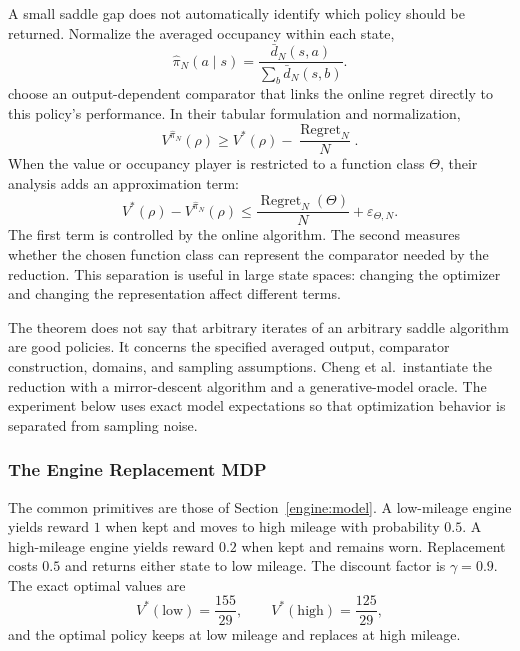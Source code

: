 A small saddle gap does not automatically identify which policy should be returned. Normalize the averaged occupancy within each state,
\begin{equation}
\widehat\pi_N(a\mid s)
=
\frac{\bar d_N(s,a)}
{\sum_b\bar d_N(s,b)}.
\label{eq:online_saddle_policy}
\end{equation}
\citet{cheng2020noregret} choose an output-dependent comparator that links the online regret directly to this policy's performance. In their tabular formulation and normalization,
\begin{equation}
V^{\widehat\pi_N}(\rho)
\geq
V^*(\rho)
-
\frac{\operatorname{Regret}_N}{N}.
\label{eq:online_cheng_tabular}
\end{equation}
When the value or occupancy player is restricted to a function class $\Theta$, their analysis adds an approximation term:
\begin{equation}
V^*(\rho)-V^{\widehat\pi_N}(\rho)
\leq
\frac{\operatorname{Regret}_N(\Theta)}{N}
+
\varepsilon_{\Theta,N}.
\label{eq:online_cheng_approximation}
\end{equation}
The first term is controlled by the online algorithm. The second measures whether the chosen function class can represent the comparator needed by the reduction. This separation is useful in large state spaces: changing the optimizer and changing the representation affect different terms.

The theorem does not say that arbitrary iterates of an arbitrary saddle algorithm are good policies. It concerns the specified averaged output, comparator construction, domains, and sampling assumptions. Cheng et al.\ instantiate the reduction with a mirror-descent algorithm and a generative-model oracle. The experiment below uses exact model expectations so that optimization behavior is separated from sampling noise.

\subsubsection{The Engine Replacement MDP}
\label{sec:online_engine_saddle}

The common primitives are those of Section~\ref{engine:model}. A low-mileage engine yields reward $1$ when kept and moves to high mileage with probability $0.5$. A high-mileage engine yields reward $0.2$ when kept and remains worn. Replacement costs $0.5$ and returns either state to low mileage. The discount factor is $\gamma=0.9$. The exact optimal values are
\[
V^*(\text{low})=\frac{155}{29},
\qquad
V^*(\text{high})=\frac{125}{29},
\]
and the optimal policy keeps at low mileage and replaces at high mileage.

